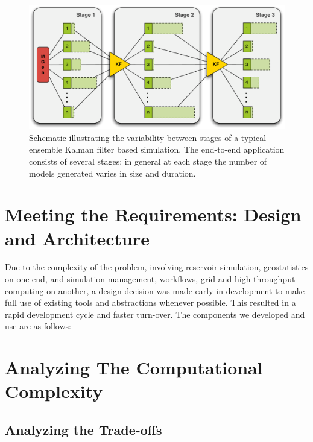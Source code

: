 \documentclass{rspublic}
\begin{document}
\begin{figure}
\begin{center}
\includegraphics*[scale=0.33,angle=0]{figures/3StageKalmanFilter}
\end{center}
\caption{Schematic illustrating the variability between stages of a typical
  ensemble Kalman filter based simulation. The end-to-end
  application consists of several stages; in general at each stage the
  number of models generated varies in size and duration.}
\label{fig:irregular_execution}
\end{figure}


\section{Meeting the Requirements: Design and Architecture}

Due to the complexity of the problem, involving reservoir simulation,
geostatistics on one end, and simulation management, workflows, grid
and high-throughput computing on another, a design decision was made
early in development to make full use of existing tools and
abstractions whenever possible. This resulted in a rapid development
cycle and faster turn-over. The components we developed and use are as
follows:

\section{Analyzing The Computational Complexity}

\subsection{Analyzing the Trade-offs}
\end{document}

